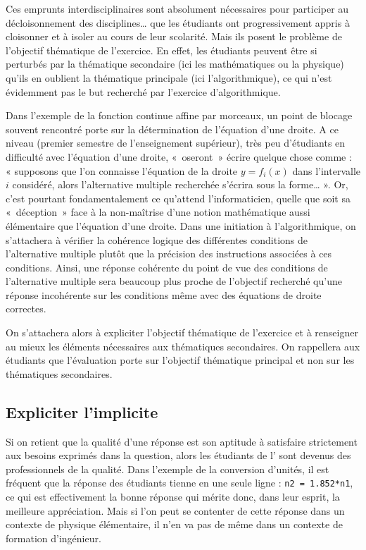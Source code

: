 \documentclass[11pt,a4paper,colorlinks,breaklinks]{article}
\begin{document}
Ces emprunts interdisciplinaires sont absolument nécessaires pour participer
au décloisonnement des disciplines\ldots{} que les étudiants ont progressivement 
appris à cloisonner et à isoler au cours de leur scolarité. 
Mais ils posent le problème de l'objectif thématique de l'exercice. 
En effet, les étudiants peuvent être si perturbés par la thématique 
secondaire (ici les mathématiques ou la physique) qu'ils en oublient la
thématique principale (ici l'algorithmique), ce qui n'est évidemment pas 
le but recherché par l'exercice d'algorithmique.

Dans l'exemple de la fonction continue affine par morceaux, un point de blocage
souvent rencontré porte sur la détermination de l'équation d'une droite. 
A ce niveau (premier semestre de l'enseignement supérieur), 
très peu d'étudiants en difficulté avec l'équation d'une droite,
«~oseront~» écrire quelque chose comme :
« supposons que l'on connaisse l'équation de la droite $y = f_i(x)$
dans l'intervalle $i$ considéré, alors l'alternative multiple recherchée 
s'écrira sous la forme\ldots{} ». Or, c'est pourtant fondamentalement ce qu'attend l'informaticien, quelle que soit sa «~déception~» face à la non-maîtrise d'une notion
mathématique aussi élémentaire que l'équation d'une droite.
Dans une initiation à l'algorithmique, on s'attachera à vérifier 
la cohérence logique des différentes conditions de l'alternative multiple 
plutôt que la précision des instructions associées à ces conditions. 
Ainsi, une réponse cohérente du point de vue des conditions de l'alternative
multiple sera beaucoup plus proche de l'objectif recherché qu'une réponse 
incohérente sur les conditions même avec des équations de droite correctes.

On s'attachera alors à expliciter l'objectif thématique de l'exercice et
à renseigner au mieux les éléments nécessaires aux thématiques secondaires.
On rappellera aux étudiants que l'évalua\-tion porte sur l'objectif thématique
principal et non sur les thématiques secondaires.


\subsection{Expliciter l'implicite}\label{subsec:qualite}
Si on retient que la qualité d'une réponse est son aptitude à satisfaire
strictement aux besoins exprimés dans la question, alors les étudiants de l'\enib{} sont 
devenus des professionnels de la qualité. 
Dans l'exemple de la conversion d'unités,
il est fréquent que la réponse des étudiants tienne en une seule ligne : 
\texttt{n2 = 1.852*n1}, ce qui est effectivement la bonne réponse qui 
mérite donc, dans leur esprit, la meilleure appréciation.
Mais si l'on peut se contenter de cette réponse dans un contexte de physique
élémentaire, il n'en va pas de même dans un contexte de formation d'ingénieur.
\end{document}
